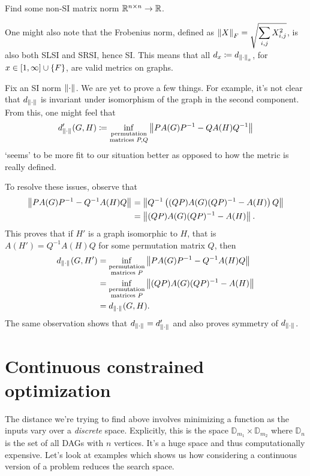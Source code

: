 \begin{qs}
Find some non-SI matrix norm $\mathbb{R}^{n\times n}\to \mathbb{R}$.
\end{qs}

One might also note that the Frobenius norm, defined as $\displaystyle \left\lVert X \right\rVert_{F} = \sqrt{\sum\limits_{i,j}X_{i,j}^2}$, is also both SLSI and SRSI, hence SI. This means that all $d_x \coloneqq d_{\left\lVert \cdot \right\rVert_{x}}$, for $x\in [1,\infty]\cup\left\{F\right\}$, are valid metrics on graphs. 

Fix an SI norm ${\left\lVert \cdot \right\rVert_{}}$. We are yet to prove a few things. For example, it's not clear that $d_{\left\lVert \cdot \right\rVert_{}}$ is invariant under isomorphism of the graph in the second component. From this, one might feel that $$d'_{\left\lVert \cdot \right\rVert_{}}(G,H)\coloneqq \inf_{\substack{\text{permutation}\\\text{matrices }P,Q}}\left\lVert PA(G)P^{-1}-QA(H)Q^{-1} \right\rVert_{}$$ `seems' to be more fit to our situation better as opposed to how the metric is really defined.

To resolve these issues, observe that \begin{align*} 
\left\lVert PA(G)P^{-1}-Q^{-1}A(H)Q \right\rVert_{} &= 
\left\lVert Q^{-1}\left((QP)A(G)(QP)^{-1}-A(H)\right)Q \right\rVert_{} \\
&= \left\lVert (QP)A(G)(QP)^{-1}-A(H) \right\rVert_{}.\end{align*} 
This proves that if $H'$ is a graph isomorphic to $H$, that is $A(H') = Q^{-1}A(H)Q$ for some permutation matrix $Q$, then \begin{align*} d_{\left\lVert \cdot \right\rVert_{}}(G,H') &=
\inf_{\substack{\text{permutation}\\\text{matrices }P}}\left\lVert PA(G)P^{-1}-Q^{-1}A(H)Q \right\rVert_{} \\
&= \inf_{\substack{\text{permutation}\\\text{matrices }P}}\left\lVert (QP)A(G)(QP)^{-1}-A(H) \right\rVert_{} \\
&= d_{\left\lVert \cdot \right\rVert_{}}(G,H).\end{align*}
The same observation shows that $d_{\left\lVert \cdot \right\rVert_{}} = d_{\left\lVert \cdot \right\rVert_{}}'$ and also proves symmetry of $d_{\left\lVert \cdot \right\rVert_{}}$.

\section{Continuous constrained optimization}

The distance we're trying to find above involves minimizing a function as the inputs vary over a \textit{discrete} space. Explicitly, this is the space $\mathbb D_{m_1}\times \mathbb D_{m_2}$ where $\mathbb D_n$ is the set of all DAGs with $n$ vertices. It's a huge space and thus computationally expensive. Let's look at examples which shows us how considering a continuous version of a problem reduces the search space.

